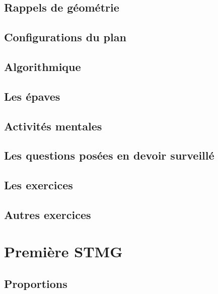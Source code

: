 \documentclass[a4paper,10pt]{book}
\begin{document}
\chapter{Rappels de géométrie}


\chapter{Configurations du plan}


\chapter{Algorithmique}


\chapter{Les épaves}


\chapter{Activités mentales}


\chapter{Les questions posées en devoir surveillé}


\chapter{Les exercices}



\chapter{Autres exercices}



\part{Première STMG}

\chapter{Proportions}

\end{document}
